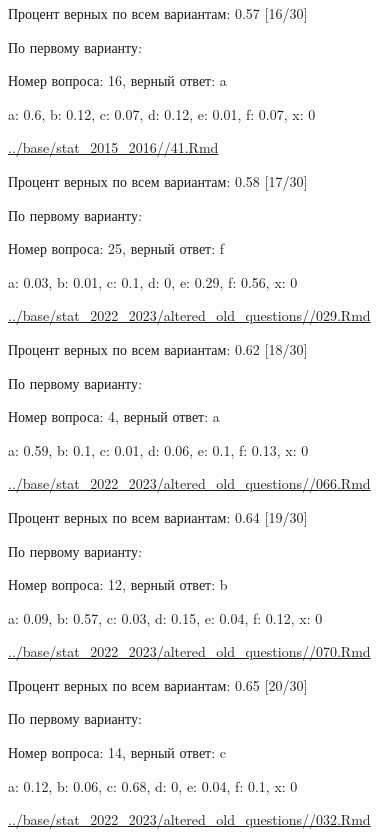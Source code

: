 Процент верных по всем вариантам: 0.57 [16/30]

По первому варианту:

Номер вопроса: 16, верный ответ: a

a: 0.6, b: 0.12, c: 0.07, d: 0.12, e: 0.01, f: 0.07, x: 0

\url{../base/stat_2015_2016//41.Rmd}





Процент верных по всем вариантам: 0.58 [17/30]

По первому варианту:

Номер вопроса: 25, верный ответ: f

a: 0.03, b: 0.01, c: 0.1, d: 0, e: 0.29, f: 0.56, x: 0

\url{../base/stat_2022_2023/altered_old_questions//029.Rmd}





Процент верных по всем вариантам: 0.62 [18/30]

По первому варианту:

Номер вопроса: 4, верный ответ: a

a: 0.59, b: 0.1, c: 0.01, d: 0.06, e: 0.1, f: 0.13, x: 0

\url{../base/stat_2022_2023/altered_old_questions//066.Rmd}





Процент верных по всем вариантам: 0.64 [19/30]

По первому варианту:

Номер вопроса: 12, верный ответ: b

a: 0.09, b: 0.57, c: 0.03, d: 0.15, e: 0.04, f: 0.12, x: 0

\url{../base/stat_2022_2023/altered_old_questions//070.Rmd}





Процент верных по всем вариантам: 0.65 [20/30]

По первому варианту:

Номер вопроса: 14, верный ответ: c

a: 0.12, b: 0.06, c: 0.68, d: 0, e: 0.04, f: 0.1, x: 0

\url{../base/stat_2022_2023/altered_old_questions//032.Rmd}






